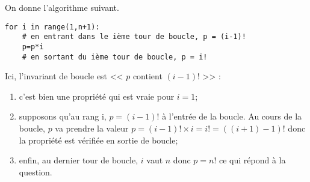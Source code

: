 On donne l'algorithme suivant. 

\begin{lstlisting}
for i in range(1,n+1):
    # en entrant dans le ième tour de boucle, p = (i-1)!
    p=p*i
    # en sortant du ième tour de boucle, p = i!
\end{lstlisting}


\ifprof
\begin{corrige}
Ici, l'invariant de boucle est << $p$ contient $(i-1)!$ >> : 
\begin{enumerate}
\item c'est bien une propriété qui est vraie pour $i=1$;
\item supposons qu'au rang i, $p=(i-1)!$ à l'entrée de la boucle. Au cours de la boucle, $p$ va prendre la valeur $p=(i-1)!\times i=i!=((i+1)-1)!$ donc la propriété est vérifiée en sortie de boucle;
\item enfin, au dernier tour de boucle, $i$ vaut $n$ donc $p=n!$ ce qui répond à la question.\\
\end{enumerate}
\end{corrige}
\else
\fi